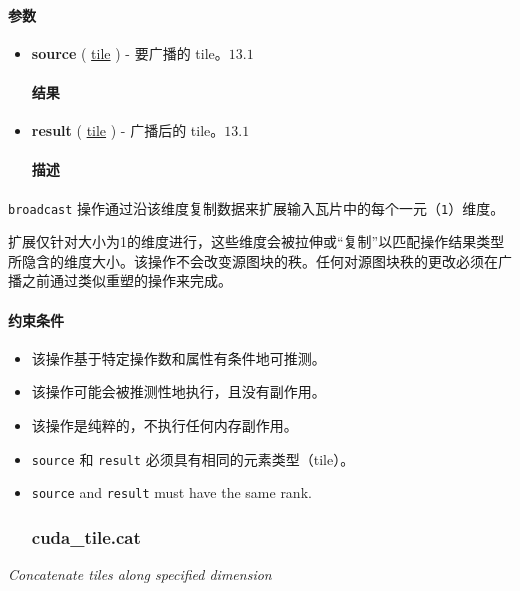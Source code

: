 \documentclass{article}
\begin{document}
\paragraph{参数}

\begin{itemize}
\item \textbf{source} ( \href{https://docs.nvidia.com/cuda/tile-ir/latest/sections/types.html#type-tile}{tile} ) - 要广播的 tile。$\boxed{13.1}$


\paragraph{结果}

\item \textbf{result} ( \href{https://docs.nvidia.com/cuda/tile-ir/latest/sections/types.html#type-tile}{tile} ) - 广播后的 tile。$\boxed{13.1}$


\paragraph{描述}

\end{itemize}
\texttt{broadcast} 操作通过沿该维度复制数据来扩展输入瓦片中的每个一元（\texttt{1}）维度。


扩展仅针对大小为1的维度进行，这些维度会被拉伸或``复制''以匹配操作结果类型所隐含的维度大小。该操作不会改变源图块的秩。任何对源图块秩的更改必须在广播之前通过类似重塑的操作来完成。



\paragraph{约束条件}

\begin{itemize}
\item 该操作基于特定操作数和属性有条件地可推测。
\item 该操作可能会被推测性地执行，且没有副作用。
\item 该操作是纯粹的，不执行任何内存副作用。
\item \texttt{source} 和 \texttt{result} 必须具有相同的元素类型（tile）。
\item \texttt{source} and \texttt{result} must have the same rank.


\subsubsection{cuda\_tile.cat}

\end{itemize}
\textit{Concatenate tiles along specified dimension}
\end{document}
